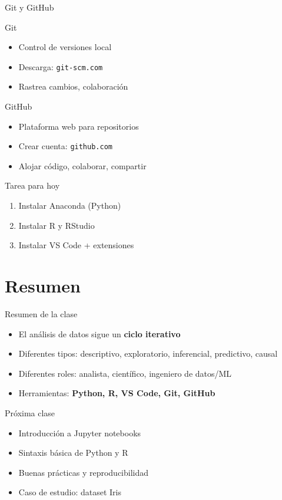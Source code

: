 \documentclass{beamer}
\begin{document}
\begin{frame}{Git y GitHub}
\begin{block}{Git}
\begin{itemize}
    \item Control de versiones local
    \item Descarga: \texttt{git-scm.com}
    \item Rastrea cambios, colaboración
\end{itemize}
\end{block}

\begin{block}{GitHub}
\begin{itemize}
    \item Plataforma web para repositorios
    \item Crear cuenta: \texttt{github.com}
    \item Alojar código, colaborar, compartir
\end{itemize}
\end{block}

\vspace{0.5em}

\begin{alertblock}{Tarea para hoy}
\begin{enumerate}
    \item Instalar Anaconda (Python)
    \item Instalar R y RStudio
    \item Instalar VS Code + extensiones
\end{enumerate}
\end{alertblock}
\end{frame}

\section{Resumen}

\begin{frame}{Resumen de la clase}
\begin{itemize}
    \item El análisis de datos sigue un \textbf{ciclo iterativo}
    \item Diferentes tipos: descriptivo, exploratorio, inferencial, predictivo, causal
    \item Diferentes roles: analista, científico, ingeniero de datos/ML
    \item Herramientas: \textbf{Python, R, VS Code, Git, GitHub}
\end{itemize}

\vspace{1em}

\begin{block}{Próxima clase}
\begin{itemize}
    \item Introducción a Jupyter notebooks
    \item Sintaxis básica de Python y R
    \item Buenas prácticas y reproducibilidad
    \item Caso de estudio: dataset Iris
\end{itemize}
\end{block}
\end{frame}
\end{document}
